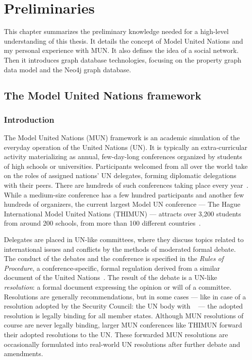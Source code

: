 \chapter{Preliminaries}
\label{chapter:preliminaries}

This chapter summarizes the preliminary knowledge needed for a high-level understanding of this thesis. It details the concept of Model United Nations and my personal experience with MUN. It also defines the idea of a social network. Then it introduces graph database technologies, focusing on the property graph data model and the Neo4j graph database.

\section{The Model United Nations framework}
\label{section:munframework}

\subsection{Introduction}

The Model United Nations (MUN) framework is an academic simulation of the everyday operation of the United Nations (UN). It is typically an extra-curricular activity materializing as annual, few-day-long conferences organized by students of high schools or universities. Participants welcomed from all over the world take on the roles of assigned nations' UN delegates, forming diplomatic delegations with their peers. There are hundreds of such conferences taking place every year~\cite{mymunconferencelist}. While a medium-size conference has a few hundred participants and another few hundreds of organizers, the current largest Model UN conference — The Hague International Model United Nations (THIMUN) — attracts over 3,200 students from around 200 schools, from more than 100 different countries~\cite{thimunabout}.

Delegates are placed in UN-like committees, where they discuss topics related to international issues and conflicts by the methods of moderated formal debate. The conduct of the debates and the conference is specified in the \emph{Rules of Procedure}, a conference-specific, formal regulation derived from a similar document of the United Nations~\cite{unmunrop}. The result of the debate is a UN-like \emph{resolution}: a formal document expressing the opinion or will of a committee. Resolutions are generally recommendations, but in some cases — like in case of a resolution adopted by the Security Council: the UN body with ~\cite{uncharter} — the adopted resolution is legally binding for all member states. Although MUN resolutions of course are never legally binding, larger MUN conferences like THIMUN forward their adopted resolutions to the UN. These forwarded MUN resolutions are occasionally formulated into real-world UN resolutions after further debate and amendments.

